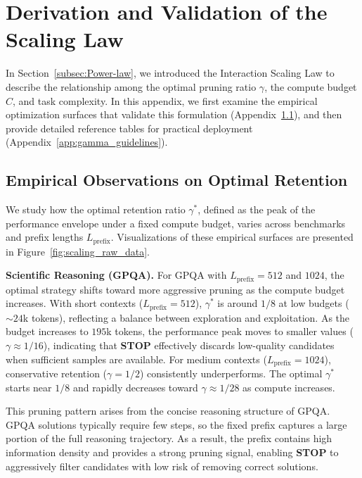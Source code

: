 \documentclass[11pt]{article}
\theoremstyle{plain}
\begin{document}
\section{Derivation and Validation of the Scaling Law}
\label{app:scaling_law}

In Section~\ref{subsec:Power-law}, we introduced the Interaction Scaling Law to describe the relationship among the optimal pruning ratio $\gamma$, the compute budget $C$, and task complexity. In this appendix, we first examine the empirical optimization surfaces that validate this formulation (Appendix~\ref{app:scaling_derivation}), and then provide detailed reference tables for practical deployment (Appendix~\ref{app:gamma_guidelines}).

\subsection{Empirical Observations on Optimal Retention}
\label{app:scaling_derivation}

We study how the optimal retention ratio $\gamma^*$, defined as the peak of the performance envelope under a fixed compute budget, varies across benchmarks and prefix lengths $L_{\text{prefix}}$. Visualizations of these empirical surfaces are presented in Figure~\ref{fig:scaling_raw_data}.

\noindent\textbf{Scientific Reasoning (GPQA).}
For GPQA with $L_{\text{prefix}}=512$ and $1024$, the optimal strategy shifts toward more aggressive pruning as the compute budget increases. With short contexts ($L_{\text{prefix}}=512$), $\gamma^*$ is around $1/8$ at low budgets ($\sim 24$k tokens), reflecting a balance between exploration and exploitation. As the budget increases to $195$k tokens, the performance peak moves to smaller values ($\gamma \approx 1/16$), indicating that \textbf{STOP} effectively discards low-quality candidates when sufficient samples are available. For medium contexts ($L_{\text{prefix}}=1024$), conservative retention ($\gamma=1/2$) consistently underperforms. The optimal $\gamma^*$ starts near $1/8$ and rapidly decreases toward $\gamma \approx 1/28$ as compute increases.

This pruning pattern arises from the concise reasoning structure of GPQA. GPQA solutions typically require few steps, so the fixed prefix captures a large portion of the full reasoning trajectory. As a result, the prefix contains high information density and provides a strong pruning signal, enabling \textbf{STOP} to aggressively filter candidates with low risk of removing correct solutions.
\end{document}
